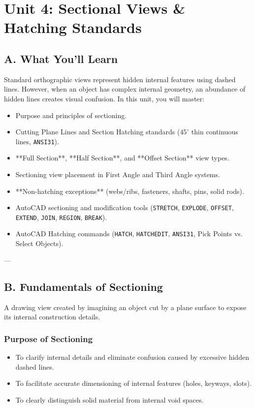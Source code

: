 \chapter{Unit 4: Sectional Views \& Hatching Standards}

\section{A. What You'll Learn}
Standard orthographic views represent hidden internal features using dashed lines. However, when an object has complex internal geometry, an abundance of hidden lines creates visual confusion. In this unit, you will master:
\begin{itemize}
    \item Purpose and principles of sectioning.
    \item Cutting Plane Lines and Section Hatching standards ($45^\circ$ thin continuous lines, \texttt{ANSI31}).
    \item **Full Section**, **Half Section**, and **Offset Section** view types.
    \item Sectioning view placement in First Angle and Third Angle systems.
    \item **Non-hatching exceptions** (webs/ribs, fasteners, shafts, pins, solid rods).
    \item AutoCAD sectioning and modification tools (\texttt{STRETCH}, \texttt{EXPLODE}, \texttt{OFFSET}, \texttt{EXTEND}, \texttt{JOIN}, \texttt{REGION}, \texttt{BREAK}).
    \item AutoCAD Hatching commands (\texttt{HATCH}, \texttt{HATCHEDIT}, \texttt{ANSI31}, Pick Points vs. Select Objects).
\end{itemize}

---

\section{B. Fundamentals of Sectioning}

\begin{definition}
A drawing view created by imagining an object cut by a plane surface to expose its internal construction details.
\end{definition}

\subsection{Purpose of Sectioning}
\begin{itemize}
    \item To clarify internal details and eliminate confusion caused by excessive hidden dashed lines.
    \item To facilitate accurate dimensioning of internal features (holes, keyways, slots).
    \item To clearly distinguish solid material from internal void spaces.
\end{itemize}

